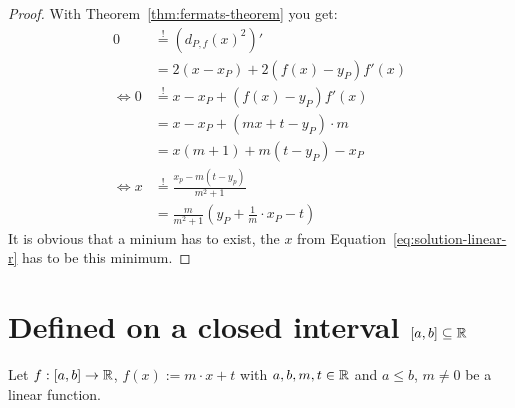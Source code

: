 \begin{proof}
    With Theorem~\ref{thm:fermats-theorem} you get:
    \begin{align}
        0 &\stackrel{!}{=} (d_{P,f}(x)^2)'\\
        &= 2(x-x_P) + 2 (f(x) - y_P)f'(x)\\
        \Leftrightarrow 0 &\stackrel{!}{=} x - x_P + (f(x) - y_P) f'(x)\\
        &= x- x_P + (mx+t - y_P)\cdot m\\
        &= x (m+1) + m(t-y_P) - x_P\\
        \Leftrightarrow x &\stackrel{!}{=} \frac{x_p - m(t-y_p)}{m^2+1}\\
        &= \frac{m}{m^2+1} \left ( y_P + \frac{1}{m} \cdot x_P - t \right )\label{eq:solution-linear-r}
    \end{align}
    It is obvious that a minium has to exist, the $x$ from Equation~\ref{eq:solution-linear-r}
    has to be this minimum.
\end{proof}
\clearpage

\section{Defined on a closed interval $[a,b] \subseteq \mathbb{R}$}
Let $f:[a,b] \rightarrow \mathbb{R}$, $f(x) := m\cdot x + t$ with $a,b,m,t \in \mathbb{R}$ and 
$a \leq b$, $m \neq 0$  be a linear function.

